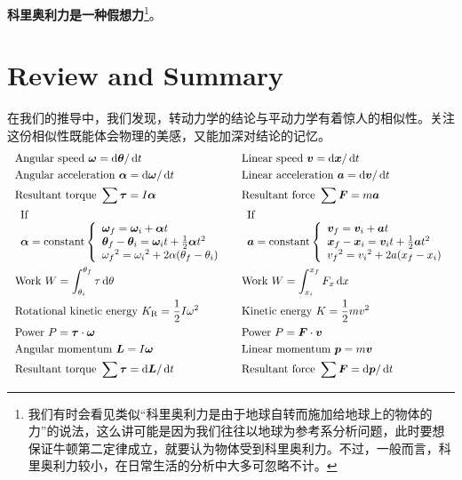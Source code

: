 {\bfseries 科里奥利力是一种假想力}\footnote{我们有时会看见类似“科里奥利力是由于地球自转而施加给地球上的物体的力”的说法，这么讲可能是因为我们往往以地球为参考系分析问题，此时要想保证牛顿第二定律成立，就要认为物体受到科里奥利力。不过，一般而言，科里奥利力较小，在日常生活的分析中大多可忽略不计。}。
\section[回顾与总结]{Review and Summary}
在我们的推导中，我们发现，转动力学的结论与平动力学有着惊人的相似性。关注这份相似性既能体会物理的美感，又能加深对结论的记忆。
\[\ \ \begin{aligned}
	&\mathrm{Angular~speed~}\vec{\omega}=\dif\vec{\theta}/\dif t&& \mathrm{Linear~speed~}\vec{v}=\dif \vec{x}/\dif t  \\
	&\mathrm{Angular~acceleration~}\vec{\alpha}=\dif\vec{\omega}/\dif t&& \mathrm{Linear~acceleration~}\vec{a}=\dif \vec{v}/\dif t  \\
	&\mathrm{Resultant~torque~}\sum\vec{\tau}=I\vec{\alpha} && \mathrm{Resultant~force~}\sum \vec{F}=m\vec{a}  \\
	&\begin{array}{l}{{\mathrm{If}}}\\{\vec{\alpha}=\mathrm{constant}}\left\{\begin{array}{l}{{\vec{\omega}_{f}=\vec{\omega}_{i}+\vec{\alpha} t}}\\{{\vec{\theta}_{f}-\vec{\theta}_{i}=\vec{\omega}_{i}t+\frac{1}{2}\vec{\alpha} t^{2}}}\\{{\omega_{f}{}^{2}=\omega_{i}{}^{2}+2\alpha(\theta_{f}-\theta_{i})}}\end{array}\right.\end{array}
	&&
	\begin{array}{l}{{\mathrm{If}}}\\{\vec{a}=\mathrm{constant}}\left\{\begin{array}{l}{{\vec{v}_{f}=\vec{v}_{i}+\vec{a}t}}\\{{\vec{x}_{f}-\vec{x}_{i}=\vec{v}_{i}t+\frac{1}{2}\vec{a}t^{2}}}\\{{v_{f}{}^{2}=v_{i}{}^{2}+2a(x_{f}-x_{i})}}\end{array}\right.\end{array}  \\
	&\mathrm{Work}\ W=\int_{\theta_{i}}^{\theta_{f}}\tau \dif\theta && \mathrm{Work}\ W=\int_{x_{i}}^{x_{f}}F_{x}\dif x  \\
	&\mathrm{Rotational~kinetic~energy~}K_{\mathrm{R}}=\frac{1}{2}I\omega^{2}&& \mathrm{Kinetic~energy~}K=\frac{1}{2}mv^{2}  \\
	&\mathrm{Power}\ P=\vec{\tau}\cdot\vec{\omega}&& \mathrm{Power}\ P=\vec{F}\cdot\vec{v}  \\
	&\mathrm{Angular~momentum~}\vec{L}=I\vec{\omega} && \mathrm{Linear~momentum~}\vec{p}=m\vec{v}  \\
	&\mathrm{Resultant~torque~}\sum\vec{\tau}=\dif \vec{L}/\dif t&& \mathrm{Resultant~force~}\sum \vec{F}=\dif \vec{p}/\dif t 
\end{aligned}\]




  






